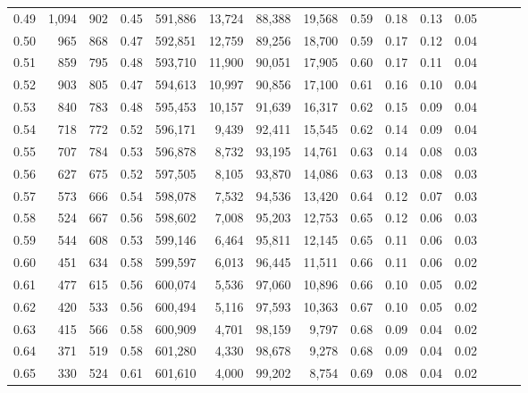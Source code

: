 \begin{tabular}{rrrrrrrrrrrrrrr}
0.49 &   1,094 &    902 &  0.45 &  591,886 &   13,724 &   88,388 &   19,568 &  0.59 &  0.18 &  0.13 &      0.05 \\
0.50 &     965 &    868 &  0.47 &  592,851 &   12,759 &   89,256 &   18,700 &  0.59 &  0.17 &  0.12 &      0.04 \\
0.51 &     859 &    795 &  0.48 &  593,710 &   11,900 &   90,051 &   17,905 &  0.60 &  0.17 &  0.11 &      0.04 \\
0.52 &     903 &    805 &  0.47 &  594,613 &   10,997 &   90,856 &   17,100 &  0.61 &  0.16 &  0.10 &      0.04 \\
0.53 &     840 &    783 &  0.48 &  595,453 &   10,157 &   91,639 &   16,317 &  0.62 &  0.15 &  0.09 &      0.04 \\
0.54 &     718 &    772 &  0.52 &  596,171 &    9,439 &   92,411 &   15,545 &  0.62 &  0.14 &  0.09 &      0.04 \\
0.55 &     707 &    784 &  0.53 &  596,878 &    8,732 &   93,195 &   14,761 &  0.63 &  0.14 &  0.08 &      0.03 \\
0.56 &     627 &    675 &  0.52 &  597,505 &    8,105 &   93,870 &   14,086 &  0.63 &  0.13 &  0.08 &      0.03 \\
0.57 &     573 &    666 &  0.54 &  598,078 &    7,532 &   94,536 &   13,420 &  0.64 &  0.12 &  0.07 &      0.03 \\
0.58 &     524 &    667 &  0.56 &  598,602 &    7,008 &   95,203 &   12,753 &  0.65 &  0.12 &  0.06 &      0.03 \\
0.59 &     544 &    608 &  0.53 &  599,146 &    6,464 &   95,811 &   12,145 &  0.65 &  0.11 &  0.06 &      0.03 \\
0.60 &     451 &    634 &  0.58 &  599,597 &    6,013 &   96,445 &   11,511 &  0.66 &  0.11 &  0.06 &      0.02 \\
0.61 &     477 &    615 &  0.56 &  600,074 &    5,536 &   97,060 &   10,896 &  0.66 &  0.10 &  0.05 &      0.02 \\
0.62 &     420 &    533 &  0.56 &  600,494 &    5,116 &   97,593 &   10,363 &  0.67 &  0.10 &  0.05 &      0.02 \\
0.63 &     415 &    566 &  0.58 &  600,909 &    4,701 &   98,159 &    9,797 &  0.68 &  0.09 &  0.04 &      0.02 \\
0.64 &     371 &    519 &  0.58 &  601,280 &    4,330 &   98,678 &    9,278 &  0.68 &  0.09 &  0.04 &      0.02 \\
0.65 &     330 &    524 &  0.61 &  601,610 &    4,000 &   99,202 &    8,754 &  0.69 &  0.08 &  0.04 &      0.02 \\

\end{tabular}
